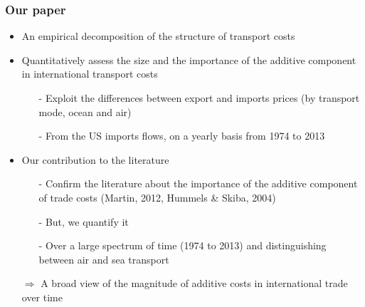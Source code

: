 \documentclass[10 pt,Helvetica, french]{beamer}
\begin{document}
\begin{frame}
\frametitle{Our paper}
\begin{itemize}
\item An empirical decomposition of the structure of transport costs \vspace{0.1cm}
\item Quantitatively assess the size and the importance of the additive component in international transport costs
\begin{itemize}
\item[-] Exploit the differences between export and imports prices (by transport mode, ocean and air)\vspace{0.1cm}
\item[-] From the US imports flows, on a yearly basis from 1974 to 2013  \vspace{0.1cm}
\end{itemize}
\item Our contribution to the literature
\begin{itemize}
\item[-] Confirm the literature about the importance of the additive component of trade costs (Martin, 2012, Hummels \& Skiba, 2004)\vspace{0.1cm}
\item[-] But, we quantify it \vspace{0.1cm}
\item[-] Over a large spectrum of time (1974 to 2013) and distinguishing between air and sea transport \vspace{0.1cm}
\end{itemize}
\item[$\Rightarrow$] A broad view of the magnitude of additive costs in international trade over time
\end{itemize}
\end{frame}
\end{document}
